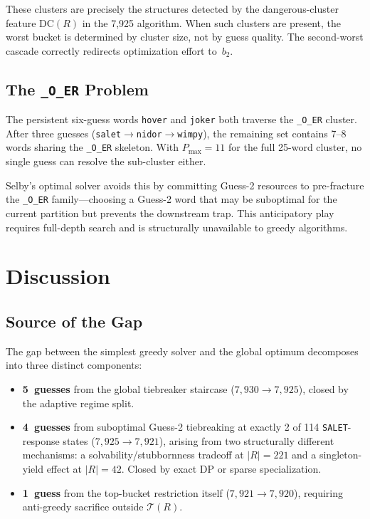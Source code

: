 \documentclass[11pt]{article}
\begin{document}
	These clusters are precisely the structures detected by the dangerous-cluster feature $\mathrm{DC}(R)$ in the 7,925 algorithm.  When such clusters are present, the worst bucket is determined by cluster size, not by guess quality.  The second-worst cascade correctly redirects optimization effort to~$b_2$.
	
	\subsection{The {\normalfont\texttt{\_O\_ER}} Problem}
	
	The persistent six-guess words \texttt{hover} and \texttt{joker} both traverse the \texttt{\_O\_ER} cluster.  After three guesses (\texttt{salet}$\to$\texttt{nidor}$\to$\texttt{wimpy}), the remaining set contains 7--8 words sharing the \texttt{\_O\_ER} skeleton.  With $P_{\max} = 11$ for the full 25-word cluster, no single guess can resolve the sub-cluster either.
	
	Selby's optimal solver avoids this by committing Guess-2 resources to pre-fracture the \texttt{\_O\_ER} family---choosing a Guess-2 word that may be suboptimal for the current partition but prevents the downstream trap.  This anticipatory play requires full-depth search and is structurally unavailable to greedy algorithms.
	
	\section{Discussion}
	
	\subsection{Source of the Gap}
	
	The gap between the simplest greedy solver and the global optimum decomposes into three distinct components:
	
	\begin{itemize}[nosep]
		\item \textbf{5~guesses} from the global tiebreaker staircase ($7{,}930 \to 7{,}925$), closed by the adaptive regime split.
		\item \textbf{4~guesses} from suboptimal Guess-2 tiebreaking at exactly 2 of 114 \texttt{SALET}-response states ($7{,}925 \to 7{,}921$), arising from two structurally different mechanisms: a solvability/stubbornness tradeoff at $|R| = 221$ and a singleton-yield effect at $|R| = 42$.  Closed by exact DP or sparse specialization.
		\item \textbf{1~guess} from the top-bucket restriction itself ($7{,}921 \to 7{,}920$), requiring anti-greedy sacrifice outside $\mathcal{T}(R)$.
	\end{itemize}
	
\end{document}
